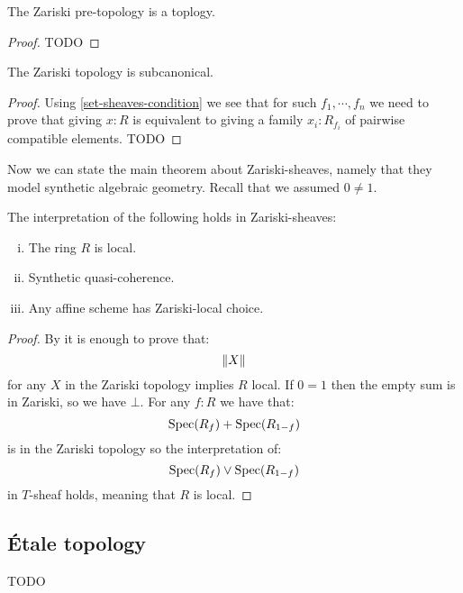 \begin{lemma}
The Zariski pre-topology is a toplogy.
\end{lemma}

\begin{proof}
TODO
\end{proof}

\begin{lemma}
The Zariski topology is subcanonical.
\end{lemma}

\begin{proof}
Using \cref{set-sheaves-condition} we see that for such $f_1,\cdots,f_n$ we need to prove that giving $x:R$ is equivalent to giving a family $x_i:R_{f_i}$ of pairwise compatible elements. TODO
\end{proof}

Now we can state the main theorem about Zariski-sheaves, namely that they model synthetic algebraic geometry. Recall that we assumed $0\not=1$.

\begin{theorem}
The interpretation of the following holds in Zariski-sheaves:
\begin{enumerate}[(i)]
\item The ring $R$ is local.
\item Synthetic quasi-coherence.
\item Any affine scheme has Zariski-local choice.
\end{enumerate}
\end{theorem}

\begin{proof}
By \label{main-result-sheaves} it is enough to prove that:
\[\lVert X \rVert\]
for any $X$ in the Zariski topology implies $R$ local. If $0=1$ then the empty sum is in Zariski, so we have $\bot$. For any $f:R$ we have that:
\[\operatorname{Spec}(R_f)+\operatorname{Spec}(R_{1-f})\]
is in the Zariski topology so the interpretation of:
\[\operatorname{Spec}(R_f) \lor \operatorname{Spec}(R_{1-f})\]
in $T$-sheaf holds, meaning that $R$ is local.
\end{proof}

\subsection{Étale topology}

TODO

